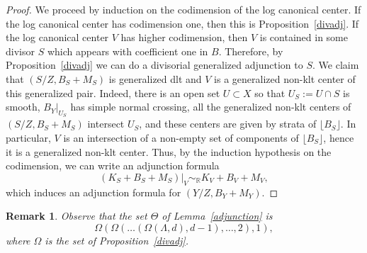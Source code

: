 \documentclass{amsart}
\newcommand{\rr}{\mathbb{R}}
\newtheorem{remark}[theorem]{Remark}
\theoremstyle{remark}
\numberwithin{equation}{section}
\begin{document}
\begin{proof}
We proceed by induction on the codimension of the log canonical center.
If the log canonical center has codimension one, then this is Proposition~\ref{divadj}.
If the log canonical center $V$ has higher codimension, then $V$ is contained in some divisor $S$ which appears with coefficient one in $B$. 
Therefore, by Proposition~\ref{divadj} we can do a divisorial generalized adjunction to $S$.
We claim that $(S/Z,B_S+M_S)$ is generalized dlt and $V$ is a generalized non-klt center of this generalized pair.
Indeed, there is an open set $U\subset X$ so that $U_S:=U\cap S$ is smooth, $B_Y|_{U_S}$ has simple normal crossing, 
all the generalized non-klt centers of $(S/Z,B_S+M_S)$ intersect $U_S$, and these centers are given by strata of $\lfloor B_S \rfloor$.
In particular, $V$ is an intersection of a non-empty set of components of $\lfloor B_S \rfloor$, 
hence it is a generalized non-klt center.
Thus, by the induction hypothesis on the codimension, we can write an adjunction formula
\[
(K_S+B_S+M_S)|_V \sim_\rr K_V+B_V+M_V,
\]
which induces an adjunction formula for $(Y/Z,B_Y+M_Y)$.
\end{proof}

\begin{remark}
Observe that the set $\Theta$ of Lemma~\ref{adjunction} 
is 
\[
\Omega(\Omega( \dots (\Omega(\Lambda,d),d-1),\dots,2),1),
\]
where $\Omega$ is the set of Proposition~\ref{divadj}.
\end{remark}
\end{document}
